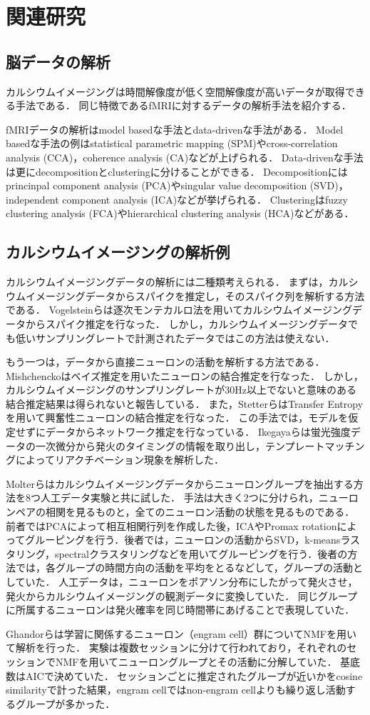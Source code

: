 \section{関連研究}
\subsection{脳データの解析}
カルシウムイメージングは時間解像度が低く空間解像度が高いデータが取得できる手法である．
同じ特徴であるfMRIに対するデータの解析手法を紹介する．

fMRIデータの解析はmodel basedな手法とdata-drivenな手法がある\cite{Li2009}．
Model basedな手法の例はstatistical parametric mapping (SPM)やcross-correlation analysis (CCA)，coherence analysis (CA)などが上げられる．
Data-drivenな手法は更にdecompositionとclusteringに分けることができる．
Decompositionにはprincinpal component analysis (PCA)やsingular value decomposition (SVD)，independent component analysis (ICA)などが挙げられる．
Clusteringはfuzzy clustering analysis (FCA)やhierarchical clustering analysis (HCA)などがある．

\subsection{カルシウムイメージングの解析例}
カルシウムイメージングデータの解析には二種類考えられる．
まずは，カルシウムイメージングデータからスパイクを推定し，そのスパイク列を解析する方法である．
Vogelsteinらは逐次モンテカルロ法を用いてカルシウムイメージングデータからスパイク推定を行なった\cite{Vogelstein2009}．
しかし，カルシウムイメージングデータでも低いサンプリングレートで計測されたデータではこの方法は使えない．

もう一つは，データから直接ニューロンの活動を解析する方法である．
Mishchenckoはベイズ推定を用いたニューロンの結合推定を行なった\cite{Mishchencko2011}．
しかし，カルシウムイメージングのサンプリングレートが30Hz以上でないと意味のある結合推定結果は得られないと報告している．
また，StetterらはTransfer Entropyを用いて興奮性ニューロンの結合推定を行なった\cite{Stetter2012}．
この手法では，モデルを仮定せずにデータからネットワーク推定を行なっている．
Ikegayaらは蛍光強度データの一次微分から発火のタイミングの情報を取り出し，テンプレートマッチングによってリアクチベーション現象を解析した\cite{Ikegaya2004}．

Molterらはカルシウムイメージングデータからニューロングループを抽出する方法を8つ人工データ実験と共に試した\cite{Molter2018}．
手法は大きく2つに分けられ，ニューロンペアの相関を見るものと，全てのニューロン活動の状態を見るものである．
前者ではPCAによって相互相関行列を作成した後，ICAやPromax rotationによってグルーピングを行う．後者では，ニューロンの活動からSVD，k-meansラスタリング，spectralクラスタリングなどを用いてグルーピングを行う．後者の方法では，各グループの時間方向の活動を平均をとるなどして，グループの活動としていた．
人工データは，ニューロンをポアソン分布にしたがって発火させ，発火からカルシウムイメージングの観測データに変換していた．
同じグループに所属するニューロンは発火確率を同じ時間帯にあげることで表現していた．

Ghandorらは学習に関係するニューロン（engram cell）群についてNMFを用いて解析を行った\cite{Ghandour2019}．
実験は複数セッションに分けて行われており，それぞれのセッションでNMFを用いてニューロングループとその活動に分解していた．
基底数はAICで決めていた．
セッションごとに推定されたグループが近いかをcosine similarityで計った結果，engram cellではnon-engram cellよりも繰り返し活動するグループが多かった．

